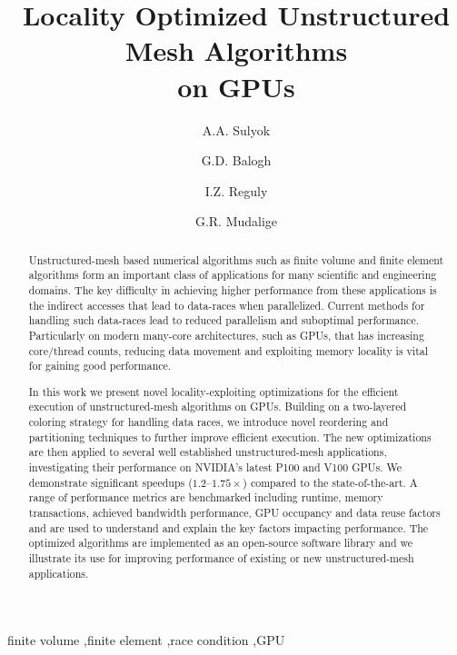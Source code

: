 \documentclass[number]{elsarticle}
\begin{document}
\begin{frontmatter}

\title{Locality Optimized Unstructured Mesh Algorithms\\ on GPUs}

  \author[1,2]{A.A. Sulyok}
  \author[1,2]{G.D. Balogh}
  \author[1]{I.Z. Reguly}
  \author[3]{G.R. Mudalige}
  \address[1]{
    Faculty of Information Technology and Bionics,
    Pázmány Péter Catholic University,
    Budapest, Hungary
  }
  \address[2]{
    3in-PPCU Research Group,
    Pázmány Péter Catholic University,
    Esztergom, Hungary
  }
   \address[3]{
    Department of Computer Science,
    University of Warwick,
    Coventry, United Kingdom
  }

\begin{abstract}

\noindent Unstructured-mesh based numerical algorithms such as finite volume and 
finite element algorithms form an important class of applications for many 
scientific and engineering domains. The key difficulty in achieving higher 
performance from these applications is the indirect accesses that lead to 
data-races when parallelized. Current methods for handling such data-races 
lead to reduced parallelism and suboptimal performance. Particularly on modern 
many-core architectures, such as GPUs, that has increasing core/thread 
counts, reducing data movement and exploiting memory locality is vital for 
gaining good performance. 

In this work we present novel locality-exploiting optimizations for the 
efficient execution of unstructured-mesh algorithms on GPUs. Building on a 
two-layered coloring strategy for handling data races, we introduce novel 
reordering and partitioning techniques to further improve efficient execution. 
The new optimizations are then applied to several well established 
unstructured-mesh applications, investigating their performance on NVIDIA's 
latest P100 and V100 GPUs. We demonstrate significant speedups 
($1.2\text{--}1.75\times$) compared to the state-of-the-art. A range of 
performance metrics are benchmarked including runtime, memory transactions, 
achieved bandwidth performance, GPU occupancy and data reuse factors and 
are used to understand and explain the key factors impacting performance. The 
optimized algorithms are implemented as an open-source software library and 
we illustrate its use for improving performance of existing or new 
unstructured-mesh applications.
\end{abstract}

\begin{keyword}
finite volume \sep finite element \sep race condition \sep GPU
\end{keyword}

\end{frontmatter}
\end{document}
